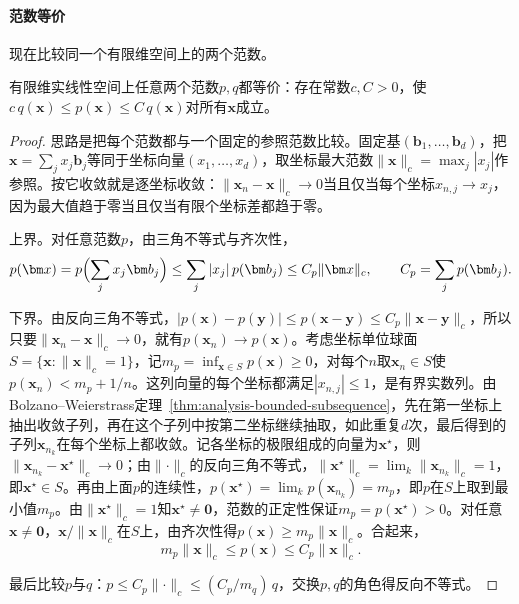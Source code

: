 \paragraph{范数等价}
现在比较同一个有限维空间上的两个范数。
\begin{theorem}[有限维范数等价]
\label{thm:ls-norm-equivalence}
有限维实线性空间上任意两个范数$p,q$都等价：存在常数$c,C>0$，使$c\,q(\bm x)\leq p(\bm x)\leq C\,q(\bm x)$对所有$\bm x$成立。
\end{theorem}
\begin{proof}
思路是把每个范数都与一个固定的参照范数比较。固定基$(\bm b_1,\ldots,\bm b_d)$，把$\bm x=\sum_jx_j\bm b_j$等同于坐标向量$(x_1,\ldots,x_d)$，取坐标最大范数$\lVert\bm x\rVert_c=\max_j|x_j|$作参照。按它收敛就是逐坐标收敛：$\lVert\bm x_n-\bm x\rVert_c\to0$当且仅当每个坐标$x_{n,j}\to x_j$，因为最大值趋于零当且仅当有限个坐标差都趋于零。

上界。对任意范数$p$，由三角不等式与齐次性，
\[
 p(\bm x)=p\Bigl(\sum_jx_j\bm b_j\Bigr)\leq\sum_j|x_j|\,p(\bm b_j)\leq C_p\lVert\bm x\rVert_c,
 \qquad C_p=\sum_jp(\bm b_j).
\]

下界。由反向三角不等式，$|p(\bm x)-p(\bm y)|\leq p(\bm x-\bm y)\leq C_p\lVert\bm x-\bm y\rVert_c$，所以只要$\lVert\bm x_n-\bm x\rVert_c\to0$，就有$p(\bm x_n)\to p(\bm x)$。考虑坐标单位球面$S=\{\bm x:\lVert\bm x\rVert_c=1\}$，记$m_p=\inf_{\bm x\in S}p(\bm x)\geq0$，对每个$n$取$\bm x_n\in S$使$p(\bm x_n)<m_p+1/n$。这列向量的每个坐标都满足$|x_{n,j}|\leq1$，是有界实数列。由Bolzano--Weierstrass定理~\ref{thm:analysis-bounded-subsequence}，先在第一坐标上抽出收敛子列，再在这个子列中按第二坐标继续抽取，如此重复$d$次，最后得到的子列$\bm x_{n_k}$在每个坐标上都收敛。记各坐标的极限组成的向量为$\bm x^\star$，则$\lVert\bm x_{n_k}-\bm x^\star\rVert_c\to0$；由$\lVert\cdot\rVert_c$的反向三角不等式，$\lVert\bm x^\star\rVert_c=\lim_k\lVert\bm x_{n_k}\rVert_c=1$，即$\bm x^\star\in S$。再由上面$p$的连续性，\label{thm:ls-extreme-value}$p(\bm x^\star)=\lim_kp(\bm x_{n_k})=m_p$，即$p$在$S$上取到最小值$m_p$。由$\lVert\bm x^\star\rVert_c=1$知$\bm x^\star\neq\bm0$，范数的正定性保证$m_p=p(\bm x^\star)>0$。对任意$\bm x\neq\bm0$，$\bm x/\lVert\bm x\rVert_c$在$S$上，由齐次性得$p(\bm x)\geq m_p\lVert\bm x\rVert_c$。合起来，
\begin{equation}
 m_p\lVert\bm x\rVert_c\leq p(\bm x)\leq C_p\lVert\bm x\rVert_c.
 \label{eq:linear-algebra-finite-norm-equivalence}
\end{equation}

最后比较$p$与$q$：$p\leq C_p\lVert\cdot\rVert_c\leq(C_p/m_q)\,q$，交换$p,q$的角色得反向不等式。
\end{proof}
